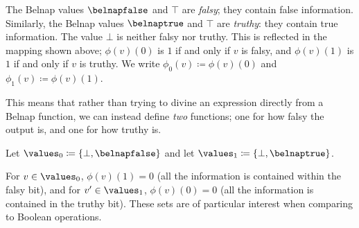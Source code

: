 The Belnap values \(\belnapfalse\) and \(\top\) are \emph{falsy}; they contain
false information.
Similarly, the Belnap values \(\belnaptrue\) and \(\top\) are \emph{truthy}:
they contain true information.
The value \(\bot\) is neither falsy nor truthy.
This is reflected in the mapping shown above; \(\phi(v)(0)\) is \(1\) if and
only if \(v\) is falsy, and \(\phi(v)(1)\) is \(1\) if and only if \(v\) is
truthy.
We write \(\phi_0(v) \coloneqq \phi(v)(0)\) and \(\phi_1(v) \coloneqq \phi(v)(1)\).

This means that rather than trying to divine an expression directly
from a Belnap function, we can instead define \emph{two} functions; one for how
falsy the output is, and one for how truthy is.

\begin{definition}
    Let \(\values_0 \coloneqq \{\bot, \belnapfalse\}\) and let
    \(\values_1 \coloneqq \{\bot, \belnaptrue\}\).
\end{definition}

For \(v \in \values_0\), \(\phi(v)(1) = 0\) (all the information is contained
within the falsy bit), and for \(v^\prime \in \values_1\), \(\phi(v)(0) = 0\)
(all the information is contained in the truthy bit).
These sets are of particular interest when comparing to Boolean operations.

